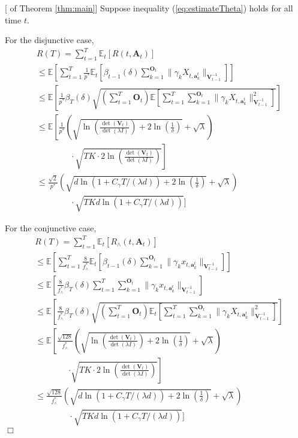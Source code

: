 \documentclass{article}
\newcommand{\EE}{\mathbb{E}}
\newcommand{\bA}{\mathbf{A}}
\newcommand{\ba}{\mathbf{a}}
\newcommand{\bO}{\mathbf{O}}
\newcommand{\bV}{\mathbf{V}}
\newcommand{\norm}[1]{\| #1 \|}
\newenvironment{proof}{\noindent {\textbf{Proof. }}}{$\Box$ \medskip}
\begin{document}
\begin{proof}[ of Theorem \ref{thm:main}]
Suppose inequality (\ref{eq:estimateTheta}) holds for all time $t$. 

For the disjunctive case,
\begin{equation}
\begin{split}
&R(T) =\sum_{t=1}^{T} \EE_{t}[R(t, \bA_t)] \\
&\leq \EE\left[\sum_{t=1}^{T} \frac{1}{p^*} \EE_t \left[\beta_{t-1}(\delta) \sum_{k=1}^{\bO_t}\norm{\gamma_k X_{t,\ba_k^t}}_{\bV_{t-1}^{-1}}\right] \right]\\
&\leq \EE \left[\frac{1}{p^*} \beta_T(\delta) \sqrt{\left(\sum_{t=1}^{T} \bO_t\right) \EE \left[\sum_{t=1}^{T} \sum_{k=1}^{\bO_t}\norm{\gamma_k X_{t,\ba_k^t}}_{\bV_{t-1}^{-1}}^2 \right]}
	\right ]  \\
&\leq \EE\left[\frac{1}{p^*} \left(\sqrt{\ln \left(\frac{\det(\bV_t)}{\det(\lambda I)}\right) + 2\ln\left(\frac{1}{\delta}\right)} + \sqrt{\lambda} \right) \right. \\
& \left. \qquad \qquad \cdot \sqrt{TK \cdot 2\ln \left(\frac{\det(\bV_t)}{\det(\lambda I)} \right)} \right]\\
&\leq \frac{\sqrt{2}}{p^*} \left(\sqrt{d\ln(1 + C_\gamma T/(\lambda d)) + 2\ln \left(\frac{1}{\delta} \right)} + \sqrt{\lambda} \right)\\
&\qquad \qquad \cdot \sqrt{TKd\ln(1 + C_\gamma T/(\lambda d))} ]
\end{split}
\end{equation}

For the conjunctive case, 
\begin{equation}
\begin{split}
&R(T) =\sum_{t=1}^{T} \EE_{t}[R_{\wedge}(t, \bA_t)] \\
&\leq \EE \left[\sum_{t=1}^{T} \frac{8}{f_{\wedge}^{\ast}} \EE_t\left[\beta_{t-1}(\delta)\sum_{k=1}^{\bO_t}\norm{\gamma_k x_{t,\ba_k^t}}_{\bV_{t-1}^{-1}} \right] \right] \\
&\leq \EE\left[\frac{8}{f_{\wedge}^{\ast}} \beta_{T}(\delta) \sum_{t=1}^{T} \sum_{k=1}^{\bO_t}\norm{\gamma_k x_{t,\ba_k^t}}_{\bV_{t-1}^{-1}} \right]\\
&\leq \EE\left[\frac{8}{f_{\wedge}^{\ast}} \beta_{T}(\delta) \sqrt{ \left(\sum_{t=1}^{T} \bO_t \right) \EE_t \left[\sum_{t=1}^{T} \sum_{k=1}^{\bO_t}\norm{\gamma_k X_{t,\ba_k^t}}_{\bV_{t-1}^{-1}}^2 \right]} \right]\\
&\leq \EE \left[\frac{\sqrt{128}}{f_{\wedge}^{\ast}} \left(\sqrt{\ln\left(\frac{\det(\bV_t)}{\det(\lambda I)}\right) + 2\ln\left(\frac{1}{\delta}\right)} + \sqrt{\lambda} \right) \right. \\
&\qquad \qquad \left. \cdot \sqrt{TK \cdot 2\ln \left(\frac{\det(\bV_t)}{\det(\lambda I)} \right)} \right]\\
&\leq \frac{\sqrt{128}}{f_{\wedge}^{\ast}} \left(\sqrt{d\ln(1 + C_\gamma T/(\lambda d)) + 2\ln \left(\frac{1}{\delta} \right)} + \sqrt{\lambda} \right)\\
&\qquad \qquad \cdot \sqrt{TKd\ln(1 + C_\gamma T/(\lambda d))} ]
\end{split}
\end{equation}
\end{proof}
	
	
	


	
\end{document}
